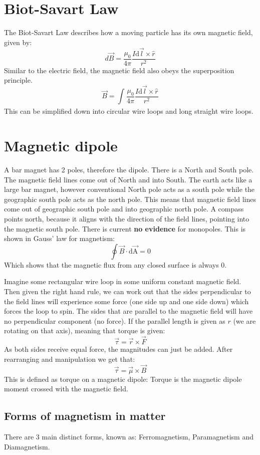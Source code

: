 \documentclass[10pt]{report}
\begin{document}
{{\section{Biot-Savart Law}
\par{The Biot-Savart Law describes how a moving particle has its own magnetic field, given by: \[
		d\vec{B}=\frac{\mu_{0}}{4\pi}\frac{I\mathrm{d}\vec{l}\times\hat{r}}{r^{2}}
\] Similar to the electric field, the magnetic field also obeys the superposition principle. \[
\vec{B}=\int_{}^{}{\frac{\mu_{0}}{4\pi}\frac{I\mathrm{d}\vec{l}\times\hat{r}}{r^{2}}}
\] }
This can be simplified down into circular wire loops and long straight wire loops. 
\section{Magnetic dipole}
\par{A bar magnet has 2 poles, therefore the dipole. There is a North and South pole. The magnetic field lines come out of North and into South. The earth acts like a large bar magnet, however conventional North pole acts as a south pole while the geographic south pole acts as the north pole. This means that magnetic field lines come out of geographic south pole and into geographic north pole. A compass points north, because it aligns with the direction of the field lines, pointing into the magnetic south pole. There is current \textbf{no evidence} for monopoles. This is shown in Gauss' law for magnetism: \[
		\oint\vec{B}\cdot\mathrm{d\vec{A}}=0
\] Which shows that the magnetic flux from any closed surface is always 0. 

Imagine some rectangular wire loop in some uniform constant magnetic field. Then given the right hand rule, we can work out that the sides perpendicular to the field lines will experience some force (one side up and one side down) which forces the loop to spin. The sides that are parallel to the magnetic field will have no perpendicular component (no force). If the parallel length is given as $r$ (we are rotating on that axis), meaning that torque is given:  \[
\vec{\tau}=\vec{r}\times\vec{F}
\] As both sides receive equal force, the magnitudes can just be added. After rearranging and manipulation we get that: \[
\vec{\tau}=\vec{\mu}\times\vec{B}
\] This is defined as torque on a magnetic dipole: Torque is the magnetic dipole moment crossed with the magnetic field.
}
\subsection{Forms of magnetism in matter}
\par{There are 3 main distinct forms, known as: Ferromagnetism, Paramagnetism and Diamagnetism.
}
}}
\end{document}
